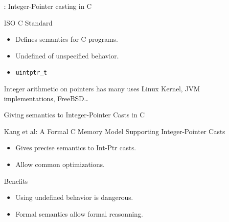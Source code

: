 \begin{frame}[fragile]{\secname : Integer-Pointer casting in C}

  \begin{minipage}{0.48\textwidth}
    
  \end{minipage}
  \begin{minipage}{0.48\textwidth}
  \begin{alertblock}{ISO C Standard}
    \begin{itemize}
    \item Defines semantics for C programs.
    \item Undefined of unspecified behavior.
    \item \texttt{uintptr\_t}
    \end{itemize}
  \end{alertblock}
  \end{minipage}
  \vfill
  \begin{exampleblock}{Integer arithmetic on pointers has many uses}
    Linux Kernel, JVM implementations, FreeBSD\dots
  \end{exampleblock}
  
\end{frame}

\begin{frame}{Giving semantics to Integer-Pointer Casts in C}

  \begin{block}{Kang et al: A Formal C Memory Model Supporting Integer-Pointer Casts}
    \begin{itemize}
    \item Gives precise semantics to Int-Ptr casts.
    \item Allow common optimizations.
    \end{itemize}
  \end{block}
  \vfill
  \begin{exampleblock}{Benefits}
    \begin{itemize}
    \item Using undefined behavior is dangerous.
    \item Formal semantics allow formal reasonning.
    \end{itemize}
  \end{exampleblock}


\end{frame}


